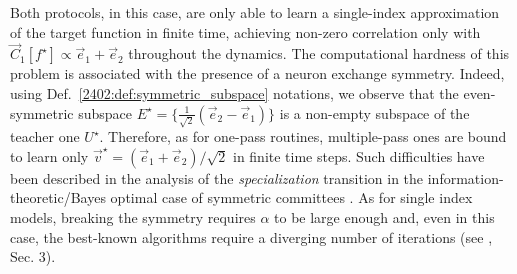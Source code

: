 \begin{itemize}
    Both protocols, in this case, are only able to learn a single-index approximation of the target function in finite time, achieving non-zero correlation only with $\vec C_1[f^\star] \propto \vec e_1 + \vec e_2$  throughout the dynamics. The computational hardness of this problem is associated with the presence of a neuron exchange symmetry. Indeed,  using Def.~\ref{2402:def:symmetric_subspace} notations, we observe that the even-symmetric subspace  $E^\star = \{\frac{1}{\sqrt{2}} \left(\vec e_2 - \vec e_1 \right)\}$ is a non-empty subspace of the teacher one $U^\star$. Therefore, as for one-pass routines, multiple-pass ones are bound to learn only $\vec{v}^\star =  \left(\vec e_1 + \vec e_2 \right)/\sqrt{2}$ in finite time steps. 
    Such difficulties have been described in the analysis of the \textit{specialization}  transition in the information-theoretic/Bayes optimal case of symmetric committees \citep{aubin2019committee}. As for single index models, breaking the symmetry requires $\alpha$ to be large enough and, even in this case, the best-known algorithms require a diverging number of iterations (see \citep{aubin2019committee}, Sec. 3).
\end{itemize}


